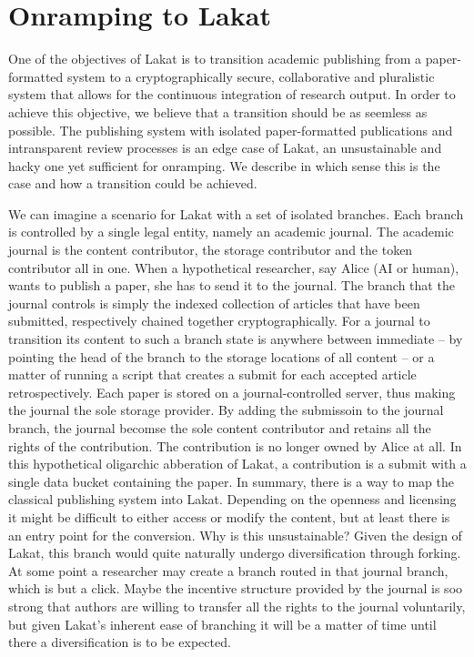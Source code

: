 \documentclass[14pt]{article}
\begin{document}
% 
% 
% 
% 
% 
% 



\section{Onramping to Lakat}

One of the objectives of Lakat is to transition academic publishing from a paper-formatted system to a cryptographically secure, collaborative and pluralistic system that allows for the continuous integration of research output. In order to achieve this objective, we believe that a transition should be as seemless as possible. The publishing system with isolated paper-formatted publications and intransparent review processes is an edge case of Lakat, an unsustainable and hacky one yet sufficient for onramping. We describe in which sense this is the case and how a transition could be achieved.

We can imagine a scenario for Lakat with a set of isolated branches. Each branch is controlled by a single legal entity, namely an academic journal. The academic journal is the content contributor, the storage contributor and the token contributor all in one. When a hypothetical researcher, say Alice (AI or human), wants to publish a paper, she has to send it to the journal. The branch that the journal  controls is simply the indexed collection of articles that have been submitted, respectively chained together cryptographically. For a journal to transition its content to such a branch state is anywhere between immediate -- by pointing the head of the branch to the storage locations of all content -- or a matter of running a script that creates a submit for each accepted article retrospectively.  Each paper is stored on a journal-controlled server, thus making the journal the sole storage provider. By adding the submissoin to the journal branch, the journal becomse the sole content contributor and retains all the rights of the contribution. The contribution is no longer owned by Alice at all. In this hypothetical oligarchic abberation of Lakat, a contribution is a submit with a single data bucket containing the paper. In summary, there is a way to map the classical publishing system into Lakat. Depending on the openness and licensing it might be difficult to either access or modify the content, but at least there is an entry point for the conversion.
Why is this unsustainable?  Given the design of Lakat, this branch would quite naturally undergo diversification through forking. At some point a researcher may create a branch routed in that journal branch, which is but a click. Maybe the incentive structure provided by the journal is soo strong that authors are willing to transfer all the rights to the journal voluntarily, but given Lakat's inherent ease of branching it will be a matter of time until there a diversification is to be expected.
\end{document}
